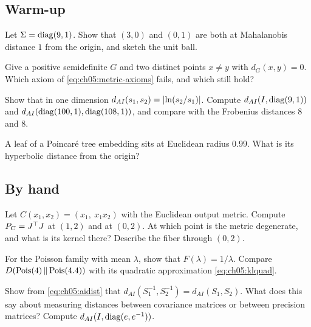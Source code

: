 \subsection*{Warm-up}

\begin{exercise}\label{exr:ch05:diag}
Let $\Sigma=\operatorname{diag}(9,1)$. Show that $(3,0)$ and $(0,1)$ are both at Mahalanobis distance $1$ from the origin, and sketch the unit ball.
\end{exercise}

\begin{exercise}\label{exr:ch05:psd}
Give a positive semidefinite $G$ and two distinct points $x\ne y$ with $d_G(x,y)=0$. Which axiom of \eqref{eq:ch05:metric-axioms} fails, and which still hold?
\end{exercise}

\begin{exercise}\label{exr:ch05:onedim}
Show that in one dimension $d_{AI}(s_1,s_2)=\lvert \ln(s_2/s_1)\rvert$. Compute $d_{AI}(I,\operatorname{diag}(9,1))$ and $d_{AI}(\operatorname{diag}(100,1),\operatorname{diag}(108,1))$, and compare with the Frobenius distances $8$ and $8$.
\end{exercise}

\begin{exercise}\label{exr:ch05:rim}
A leaf of a Poincar\'e tree embedding sits at Euclidean radius $0.99$. What is its hyperbolic distance from the origin?
\end{exercise}

\subsection*{By hand}

\begin{exercise}\label{exr:ch05:pullback}
Let $C(x_1,x_2)=(x_1,\ x_1x_2)$ with the Euclidean output metric. Compute $P_C=J^{\top} J$ at $(1,2)$ and at $(0,2)$. At which point is the metric degenerate, and what is its kernel there? Describe the fiber through $(0,2)$.
\end{exercise}

\begin{exercise}\label{exr:ch05:poisson}
For the Poisson family with mean $\lambda$, show that $F(\lambda)=1/\lambda$. Compare $D\!\left(\mathrm{Pois}(4)\,\middle\|\,\mathrm{Pois}(4.4)\right)$ with its quadratic approximation \eqref{eq:ch05:klquad}.
\end{exercise}

\begin{exercise}\label{exr:ch05:inverse}
Show from \eqref{eq:ch05:aidist} that $d_{AI}(S_1^{-1},S_2^{-1})=d_{AI}(S_1,S_2)$. What does this say about measuring distances between covariance matrices or between precision matrices? Compute $d_{AI}(I,\operatorname{diag}(e,e^{-1}))$.
\end{exercise}

